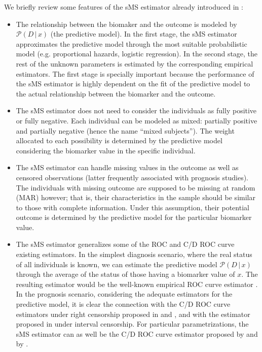 We briefly review some features of the sMS estimator already introduced in \citet{Diaz-Coto2021}:
\begin {itemize}

\item{The relationship between the biomaker and the outcome is modeled by $\mathcal{P}(D\,|\,x)$ (the predictive model). In the first stage, the sMS estimator approximates the predictive model through the most suitable probabilistic model (e.g. proportional hazards, logistic regression). In the second stage, the rest of the unknown parameters is estimated by the corresponding empirical estimators. The first stage is specially important because the performance of the sMS estimator is highly dependent on the fit of the predictive model to the actual relationship between the biomarker and the outcome.}

\item{The sMS estimator does not need to consider the individuals as fully positive or fully negative. Each individual can be modeled as mixed: partially positive and partially negative (hence the name ``mixed subjects''). The weight allocated to each possibility is determined by the predictive model considering the biomarker value in the specific individual.}

\item{The sMS estimator can handle missing values in the outcome as well as censored observations (latter frequently associated with prognosis studies). The individuals with missing outcome are supposed to be missing at random (MAR) however; that is, their characteristics in the sample should be similar to those with complete information. Under this assumption, their potential outcome is determined by the predictive model for the particular biomarker value.}

\item{The sMS estimator generalizes some of the ROC and C/D ROC curve existing estimators. In the simplest diagnosis scenario, where the real status of all individuals is known, we can estimate the predictive model  $\mathcal{P}(D\,|\,x)$  through the average of the status of those having a biomarker value of $x$. The resulting estimator would be the well-known empirical ROC curve estimator \citep{Hsieh1996}. In the prognosis scenario, considering the adequate estimators for the predictive model, it is clear the connection with the C/D ROC curve estimators under right censorship proposed in \citet{Martinez-Camblor2016} and \citet{li18}, and with the estimator proposed in \citet{Diaz-Coto2020} under interval censorship.  For particular parametrizations, the sMS estimator can as well be the C/D ROC curve estimator proposed  by \citet{Chambles2006} and by \citet{Song2008}.}


\end{itemize}

